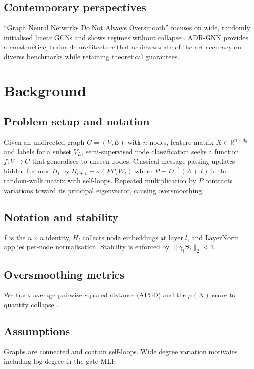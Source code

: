\documentclass{article}
\begin{document}
\subsection{Contemporary perspectives}
“Graph Neural Networks Do Not Always Oversmooth” focuses on wide, randomly initialised linear GCNs and shows regimes without collapse \cite{epping-2024-graph}. ADR-GNN provides a constructive, trainable architecture that achieves state-of-the-art accuracy on diverse benchmarks while retaining theoretical guarantees.

\section{Background}
\subsection{Problem setup and notation}
Given an undirected graph \(G = (V,E)\) with \(n\) nodes, feature matrix \(X \in \mathbb{R}^{n \times d_0}\) and labels for a subset \(V_L\), semi-supervised node classification seeks a function \(f: V \to C\) that generalises to unseen nodes. Classical message passing updates hidden features \(H_l\) by \(H_{l+1} = \sigma(P H_l W_l)\) where \(P = D^{-1}(A+I)\) is the random-walk matrix with self-loops. Repeated multiplication by \(P\) contracts variations toward its principal eigenvector, causing oversmoothing.

\subsection{Notation and stability}
\(I\) is the \(n \times n\) identity, \(H_l\) collects node embeddings at layer \(l\), and \(\mathrm{LayerNorm}\) applies per-node normalisation. Stability is enforced by \(\lVert \gamma_l \Theta_l \rVert_2 < 1\).

\subsection{Oversmoothing metrics}
We track average pairwise squared distance (APSD) and the \(\mu(X)\) score to quantify collapse \cite{zhao-2019-pairnorm}.

\subsection{Assumptions}
Graphs are connected and contain self-loops. Wide degree variation motivates including log-degree in the gate MLP.
\end{document}
